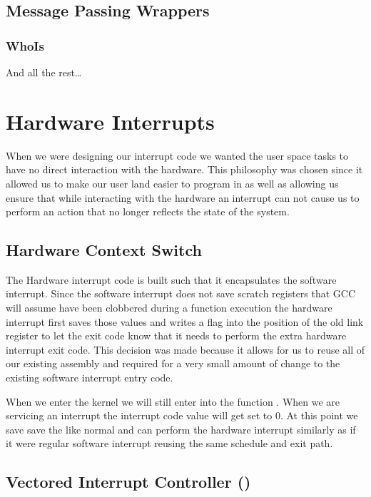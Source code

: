 \documentclass[pdftex,10pt,a4paper]{article}
\begin{document}
\subsection*{Message Passing Wrappers}

\subsubsection*{WhoIs}

And all the rest\ldots

\section*{Hardware Interrupts}

When we were designing our interrupt code we wanted the user space tasks to
have no direct interaction with the hardware. This philosophy was chosen since
it allowed us to make our user land easier to program in as well as allowing us
ensure that while interacting with the hardware an interrupt can not cause us
to perform an action that no longer reflects the state of the system.

\subsection*{Hardware Context Switch}

The Hardware interrupt code is built such that it encapsulates the software
interrupt. Since the software interrupt does not save scratch registers that
GCC will assume have been clobbered during a function execution the hardware
interrupt first saves those values and writes a flag into the position of the
old link register to let the exit code know that it needs to perform the extra
hardware interrupt exit code. This decision was made because it allows for us
to reuse all of our existing assembly and required for a very small amount of
change to the existing software interrupt entry code.

When we enter the kernel we will still enter into the function
. When we are servicing an interrupt the interrupt code
value will get set to 0. At this point we save save the  like normal
and can perform the hardware interrupt similarly as if it were regular software
interrupt reusing the same schedule and exit path.

\subsection*{Vectored Interrupt Controller ()}
\end{document}
